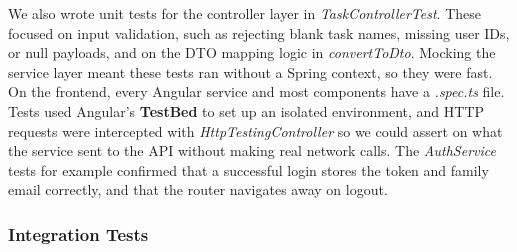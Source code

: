 \noindent
We also wrote unit tests for the controller layer in \textit{TaskControllerTest}. These focused on input validation, such as rejecting blank task names, missing user IDs, or null payloads, and on the DTO mapping logic in \textit{convertToDto}. Mocking the service layer meant these tests ran without a Spring context, so they were fast.
\newline
\newline
\noindent
On the frontend, every Angular service and most components have a \textit{.spec.ts} file. Tests used Angular's \textbf{TestBed} to set up an isolated environment, and HTTP requests were intercepted with \textit{HttpTestingController} so we could assert on what the service sent to the API without making real network calls. The \textit{AuthService} tests for example confirmed that a successful login stores the token and family email correctly, and that the router navigates away on logout.

\subsubsection{Integration Tests}

